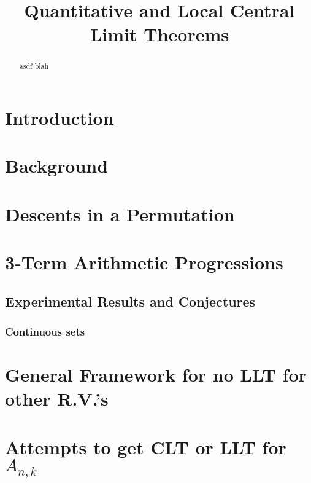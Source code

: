 \documentclass[12pt]{amsart} %
\title{Quantitative and Local Central Limit Theorems}
\author{}
\date{}
\theoremstyle{definition}
\theoremstyle{remark}
\begin{document}
\maketitle

\begin{abstract}
asdf blah
\end{abstract}

\section{Introduction}


\section{Background}


\section{Descents in a Permutation}

\section{3-Term Arithmetic Progressions}

\subsection{Experimental Results and Conjectures}

\subsubsection{Continuous sets}

\section{General Framework for no LLT for other R.V.'s}

\section{Attempts to get CLT or LLT for $A_{n,k}$}
\end{document}
